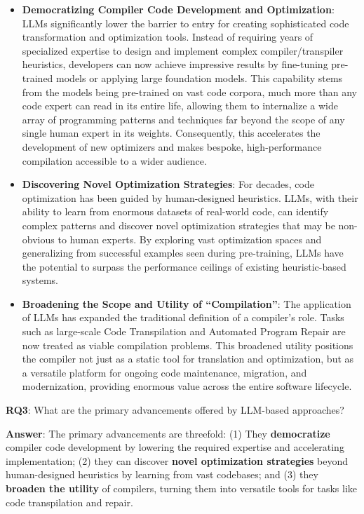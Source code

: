 \documentclass[pdflatex,sn-mathphys-ay,twocolumn, a4paper]{sn-jnl}%
\theoremstyle{thmstyleone}%
\theoremstyle{thmstyletwo}%
\theoremstyle{thmstylethree}%
\begin{document}
\begin{itemize}
    \item \textbf{Democratizing Compiler Code Development and Optimization}: LLMs significantly lower the barrier to entry for creating sophisticated code transformation and optimization tools. Instead of requiring years of specialized expertise to design and implement complex compiler/transpiler heuristics, developers can now achieve impressive results by fine-tuning pre-trained models or applying large foundation models. This capability stems from the models being pre-trained on vast code corpora, much more than any code expert can read in its entire life, allowing them to internalize a wide array of programming patterns and techniques far beyond the scope of any single human expert in its weights. Consequently, this accelerates the development of new optimizers and makes bespoke, high-performance compilation accessible to a wider audience.
    \item \textbf{Discovering Novel Optimization Strategies}: For decades, code optimization has been guided by human-designed heuristics. LLMs, with their ability to learn from enormous datasets of real-world code, can identify complex patterns and discover novel optimization strategies that may be non-obvious to human experts. By exploring vast optimization spaces and generalizing from successful examples seen during pre-training, LLMs have the potential to surpass the performance ceilings of existing heuristic-based systems.
    \item \textbf{Broadening the Scope and Utility of ``Compilation''}: The application of LLMs has expanded the traditional definition of a compiler's role. Tasks such as large-scale Code Transpilation and Automated Program Repair are now treated as viable compilation problems. This broadened utility positions the compiler not just as a static tool for translation and optimization, but as a versatile platform for ongoing code maintenance, migration, and modernization, providing enormous value across the entire software lifecycle.
\end{itemize}

\begin{tcolorbox}[colback=white,colframe=black]
    \textbf{RQ3}: What are the primary advancements offered by LLM-based approaches?

    \textbf{Answer}: The primary advancements are threefold: (1) They \textbf{democratize} compiler code development by lowering the required expertise and accelerating implementation; (2) they can discover \textbf{novel optimization strategies} beyond human-designed heuristics by learning from vast codebases; and (3) they \textbf{broaden the utility} of compilers, turning them into versatile tools for tasks like code transpilation and repair.
\end{tcolorbox}
\end{document}
